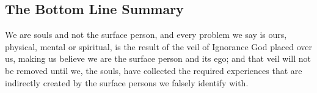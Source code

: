 \documentclass[12pt,a4paper]{book}
\begin{document}
\newpage
\begin{center}\section*{The Bottom Line Summary}\end{center}

We are souls and not the surface person, and every problem we say is
ours, physical, mental or spiritual, is the result of the veil of
Ignorance God placed over us, making us believe we are the surface
person and its ego; and that veil will not be removed until we, the
souls, have collected the required experiences that are indirectly
created by the surface persons we falsely identify with.




\end{document}
